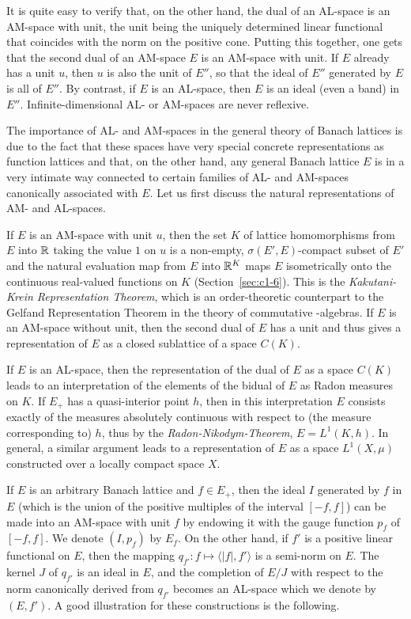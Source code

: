 It is quite easy to verify that, on the other hand, the dual of an AL-space is an AM-space with unit, the unit being the uniquely determined linear functional that coincides with the norm on the positive cone.
Putting this together, one gets that the second dual of an AM-space $ E $ is an AM-space with unit.
If\/ $ E $ already has a unit $ u $, then $ u $ is also the unit of\/ $ E'' $, so that the ideal of\/ $ E'' $ generated by $ E $ is all of\/ $ E'' $.
By contrast, if\/ $ E $ is an AL-space, then $ E $ is an ideal (even a band) in $ E'' $.
Infinite-dimensional AL- or AM-spaces are never reflexive.

The importance of AL- and AM-spaces in the general theory of Banach lattices is due to the fact that these spaces have very special concrete representations as function lattices and that, on the other hand, any general Banach lattice $ E $ is in a very intimate way connected to certain families of AL- and AM-spaces canonically associated with $ E $.
Let us first discuss the natural representations of AM- and AL-spaces.

If\/ $ E $ is an AM-space with unit $ u $, then the set $ K $ of lattice homomorphisms from $ E $ into $ \mathbb{R} $ taking the value $ 1 $ on $ u $ is a non-empty, $ \sigma(E',E) $-compact subset of\/ $ E' $ and the natural evaluation map from $ E $ into $ \mathbb{R}^{K} $ maps $ E $ isometrically onto the continuous real-valued functions on $ K $ (\cf Section~\ref{sec:c1-6}).
This is the \emph{Kakutani-Krein Representation Theorem}, which is an order-theoretic counterpart to the Gelfand Representation Theorem in the theory of commutative \CA-algebras.
If\/ $ E $ is an AM-space without unit, then the second dual of\/ $ E $ has a unit and thus gives a representation of\/ $ E $ as a closed sublattice of a space $ C(K) $.

If\/ $ E $ is an AL-space, then the representation of the dual of\/ $ E $ as a space $ C(K) $ leads to an interpretation of the elements of the bidual of\/ $ E $ as Radon measures on $ K $.
If\/ $ E_{+} $ has a quasi-interior point $ h $, then in this interpretation $ E $ consists exactly of the measures absolutely continuous with respect to (the measure corresponding to) $ h $, thus by the \emph{Radon-Nikodym-Theorem}, $ E = L^{1}(K,h) $.
In general, a similar argument leads to a representation of\/ $ E $ as a space $ L^{1}(X,\mu) $ constructed over a locally compact space $ X $.

If\/ $ E $ is an arbitrary Banach lattice and $ f \in E_{+} $, then the ideal $ I $ generated by $ f $ in $ E $ (which is the union of the positive multiples of the interval $ [-f,f] $) can be made into an AM-space with unit $ f $ by endowing it with the gauge function $ p_{f} $ of\/ $ [-f,f] $.
We denote $ (I,p_{f}) $ by $ E_{f} $.
On the other hand, if\/ $ f' $ is a positive linear functional on $ E $, then the mapping $ q_{f'} \colon f \mapsto \langle |f|,f'\rangle $ is a semi-norm on $ E $.
The kernel $ J $ of\/ $ q_{f'} $ is an ideal in $ E $, and the completion of\/ $ E/J $ with respect to the norm canonically derived from $ q_{f'} $ becomes an AL-space which we denote by $ (E,f') $.
A good illustration for these constructions is the following.


